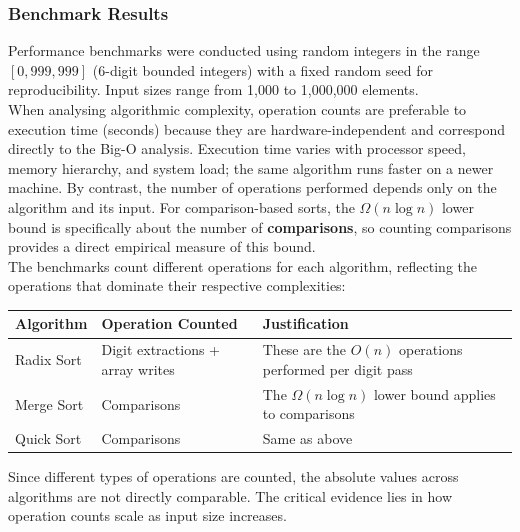 \documentclass[12pt]{article}
\begin{document}
\subsubsection{Benchmark Results}

Performance benchmarks were conducted using random integers in the range $[0, 999{,}999]$ (6-digit bounded integers) with a fixed random seed for reproducibility. Input sizes range from 1,000 to 1,000,000 elements. \\ 

When analysing algorithmic complexity, operation counts are preferable to execution time (seconds) because they are hardware-independent and correspond directly to the Big-O analysis. Execution time varies with processor speed, memory hierarchy, and system load; the same algorithm runs faster on a newer machine. By contrast, the number of operations performed depends only on the algorithm and its input. For comparison-based sorts, the $\Omega(n \log n)$ lower bound is specifically about the number of \textbf{comparisons}, so counting comparisons provides a direct empirical measure of this bound. \\

The benchmarks count different operations for each algorithm, reflecting the operations that dominate their respective complexities:

\begin{table}[h]
\centering
\begin{tabularx}{\linewidth}{@{}lXX@{}}
\toprule
\textbf{Algorithm} & \textbf{Operation Counted} & \textbf{Justification} \\
\midrule
Radix Sort & Digit extractions + array writes & These are the $O(n)$ operations performed per digit pass \\
Merge Sort & Comparisons & The $\Omega(n \log n)$ lower bound applies to comparisons \\
Quick Sort & Comparisons & Same as above \\
\bottomrule
\end{tabularx}
\end{table}

Since different types of operations are counted, the absolute values across algorithms are not directly comparable. The critical evidence lies in how operation counts scale as input size increases.
\end{document}
